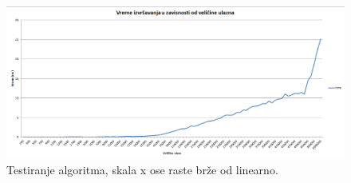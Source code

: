 \documentclass[a4paper]{article}
\begin{document}
\begin{figure}
    \includegraphics[width=\textwidth]{chart.png}
    \caption{Testiranje algoritma, skala x ose raste brže od linearno.}
    \label{fig:chart}
\end{figure}

\appendix
 

\end{document}
